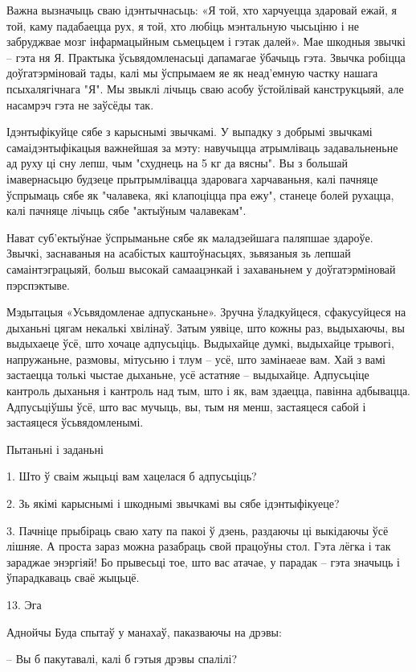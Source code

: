 Важна вызначыць сваю ідэнтычнасьць: «Я той, хто харчуецца здаровай ежай, я той, каму падабаецца рух, я той, хто любіць мэнтальную чысьціню і не забруджвае мозг інфармацыйным сьмецьцем і гэтак далей». Мае шкодныя звычкі – гэта ня Я. Практыка ўсьвядомленасьці дапамагае ўбачыць гэта. Звычка робіцца доўгатэрміновай тады, калі мы ўспрымаем яе як неад'емную частку нашага псыхалягічнага "Я". Мы звыклі лічыць сваю асобу ўстойлівай канструкцыяй, але насамрэч гэта не заўсёды так. 

Ідэнтыфікуйце сябе з карыснымі звычкамі. У выпадку з добрымі звычкамі самаідэнтыфікацыя важнейшая за мэту: навучыцца атрымліваць задавальненьне ад руху ці сну лепш, чым "схуднець на 5 кг да вясны". Вы з большай імавернасьцю будзеце прытрымлівацца здаровага харчаваньня, калі пачняце ўспрымаць сябе як "чалавека, які клапоціцца пра ежу", станеце болей рухацца, калі пачняце лічыць сябе "актыўным чалавекам".

Нават суб'ектыўнае ўспрыманьне сябе як маладзейшага паляпшае здароўе. Звычкі, заснаваныя на асабістых каштоўнасьцях, зьвязаныя зь лепшай самаінтэграцыяй, больш высокай самаацэнкай і захаваньнем у доўгатэрміновай пэрспэктыве.

Мэдытацыя «Усьвядомленае адпусканьне». Зручна ўладкуйцеся, сфакусуйцеся на дыханьні цягам некалькі хвілінаў. Затым уявіце, што кожны раз, выдыхаючы, вы выдыхаеце ўсё, што хочаце адпусьціць. Выдыхайце думкі, выдыхайце трывогі, напружаньне, размовы, мітусьню і тлум – усё, што замінаеае вам. Хай з вамі застаецца толькі чыстае дыханьне, усё астатняе – выдыхайце. Адпусьціце кантроль дыханьня і кантроль над тым, што і як, вам здаецца, павінна адбывацца. Адпусьціўшы ўсё, што вас мучыць, вы, тым ня менш, застаяцеся сабой і застаяцеся ўсьвядомленымі.

Пытаньні і заданьні

1. Што ў сваім жыцьці вам хацелася б адпусьціць?

2. Зь якімі карыснымі і шкоднымі звычкамі вы сябе ідэнтыфікуеце?

3. Пачніце прыбіраць сваю хату па пакоі ў дзень, раздаючы ці выкідаючы ўсё лішняе. А проста зараз можна разабраць свой працоўны стол. Гэта лёгка і так зараджае энэргіяй! Бо прывесьці тое, што вас атачае, у парадак – гэта значыць і ўпарадкаваць сваё жыцьцё.


13. Эга

Аднойчы Буда спытаў у манахаў, паказваючы на дрэвы: 

– Вы б пакутавалі, калі б гэтыя дрэвы спалілі?

